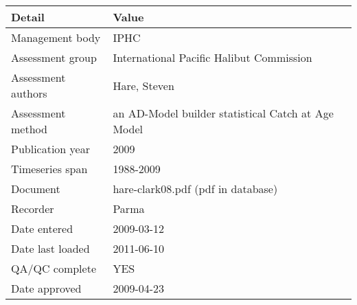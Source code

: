 \begin{table}[htb]
\centering
\begin{tabular}{lp{7cm}}
\toprule
Detail & Value \\
\midrule
Management body    & IPHC                                               \\
Assessment group   & International Pacific Halibut Commission           \\
Assessment authors & Hare, Steven                                       \\
Assessment method  & an AD-Model builder statistical Catch at Age Model \\
Publication year   & 2009                                               \\
Timeseries span    & 1988-2009                                          \\
Document           & hare-clark08.pdf (pdf in database)                 \\
Recorder           & Parma                                              \\
Date entered       & 2009-03-12                                         \\
Date last loaded   & 2011-06-10                                         \\
QA/QC complete     & YES                                                \\
Date approved      & 2009-04-23                                         \\
\bottomrule
\end{tabular}
\label{tab:assessdet}
\end{table}
